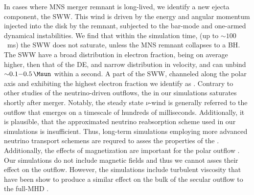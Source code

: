 In cases where \ac{MNS} merger remnant is long-lived, we identify a new ejecta component, 
the \ac{SWW}. This wind is driven by the energy and angular momentum injected into the 
disk by the remnant, subjected to the bar-mode and one-armed dynamical instabilities.
We find that within the simulation time, (up to ${\sim}100$~ms) the \ac{SWW} does not 
saturate, unless the \ac{MNS} remnant collapses to a \ac{BH}.
The \ac{SWW} have a broad distribution in electron fraction, being on average higher,
then that of the \ac{DE}, and narrow distribution in velocity, and can unbind
${\sim}0.1{-}0.5\, \Msun$ within a second.
A part of the \ac{SWW}, channeled along the polar axis and exhibiting the highest
electron fraction we identify as \nwind{}. Contrary to other studies of the 
neutrino-driven outflows, \citet{Dessart:2008zd,Perego:2014fma,Fujibayashi:2020dvr}
the \nwind{} in our simulations saturates shortly after merger.
%
Notably, the steady state $\nu$-wind is generally referred to the outflow 
that emerges on a timescale of hundreds of milliseconds. Additionally, it is 
plausible, that the approximated neutrino reabsorption scheme used in our 
simulations is insufficient. Thus, long-term simulations employing more advanced 
neutrino transport schemens are requred to asses the properties of the \nwind.
%
Additionally, the effects of magnetization are important for the polar outflow 
\citep{Siegel:2017nub,Metzger:2018uni,Fernandez:2018kax,Miller:2019dpt,Mosta:2020hlh}.
Our simulations do not include magnetic fields and thus we cannot asses their 
effect on the outflow. However, the simulations include turbulent viscosity 
that have been show to produce a similar effect on the bulk of the secular 
outflow to the full-\ac{MHD} \citep{Fernandez:2018kax}.

